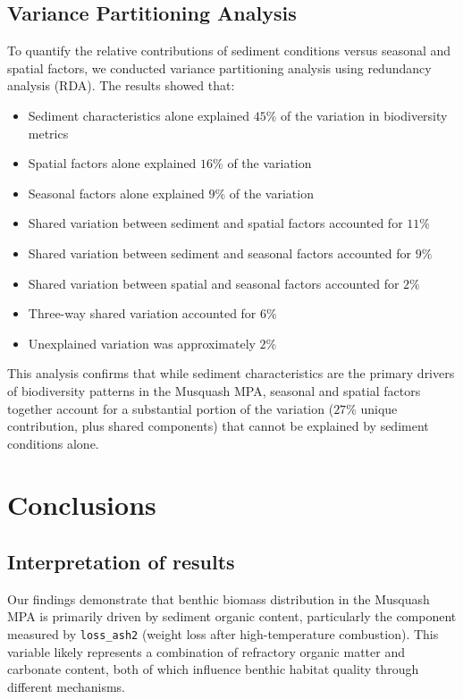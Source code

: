 \documentclass[12pt]{article}
\begin{document}
{\subsection{Variance Partitioning Analysis}

To quantify the relative contributions of sediment conditions versus seasonal
and spatial factors, we conducted variance partitioning analysis using
redundancy analysis (RDA). The results showed that:

\begin{itemize}

    \item Sediment characteristics alone explained $45\%$ of the variation in biodiversity metrics
    \item Spatial factors alone explained $16\%$ of the variation
    \item Seasonal factors alone explained $9\%$ of the variation
    \item Shared variation between sediment and spatial factors accounted for $11\%$
    \item Shared variation between sediment and seasonal factors accounted for $9\%$
    \item Shared variation between spatial and seasonal factors accounted for $2\%$
    \item Three-way shared variation accounted for $6\%$
    \item Unexplained variation was approximately $2\%$
\end{itemize}

This analysis confirms that while sediment characteristics are the primary drivers of biodiversity patterns in the Musquash MPA, seasonal and spatial factors together account for a substantial portion of the variation ($27\%$ unique contribution, plus shared components) that cannot be explained by sediment conditions alone.


\newpage
\section{Conclusions}
\subsection{Interpretation of results}

\qquad Our findings demonstrate that benthic biomass distribution in the
Musquash MPA is primarily driven by sediment organic content, particularly the
component measured by \texttt{loss\_ash2} (weight loss after high-temperature
combustion). This variable likely represents a combination of refractory organic
matter and carbonate content, both of which influence benthic habitat quality
through different mechanisms.

}
\end{document}
